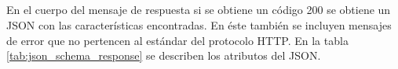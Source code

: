 

\subparagraph{}
\label{\detokenize{chapter_two/desc_cloudnao:respuesta}}

\subparagraph{}
\label{\detokenize{chapter_two/desc_cloudnao:id1}}
En el cuerpo del mensaje de respuesta si se obtiene un código 200
se obtiene un JSON con las características encontradas. En éste también
se incluyen mensajes de error que no pertencen al estándar del protocolo HTTP.
En la tabla \ref{tab:json_schema_response} se describen los atributos del JSON.

